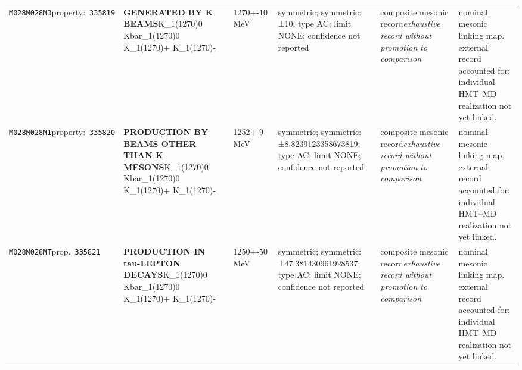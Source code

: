 \begin{landscape}
\begin{longtable}{L{1.85cm}L{4.45cm}L{2.35cm}L{4.05cm}L{3.35cm}L{7.15cm}}
\texttt{M028}\newline \texttt{M028M3}\newline property:\ \texttt{335819} & \textbf{GENERATED BY K BEAMS}\newline K\_\allowbreak{}1(1270)0 \textbar{}\allowbreak{} Kbar\_\allowbreak{}1(1270)0 \textbar{}\allowbreak{} K\_\allowbreak{}1(1270)+ \textbar{}\allowbreak{} K\_\allowbreak{}1(1270)- & 1270+-10\,MeV & symmetric; symmetric: ±10; type AC; limit NONE; confidence not reported & composite mesonic record\newline \emph{exhaustive record without promotion to comparison} & nominal mesonic linking map. external record accounted for; individual HMT--MD realization not yet linked. \\
\texttt{M028}\newline \texttt{M028M1}\newline property:\ \texttt{335820} & \textbf{PRODUCTION BY BEAMS OTHER THAN K MESONS}\newline K\_\allowbreak{}1(1270)0 \textbar{}\allowbreak{} Kbar\_\allowbreak{}1(1270)0 \textbar{}\allowbreak{} K\_\allowbreak{}1(1270)+ \textbar{}\allowbreak{} K\_\allowbreak{}1(1270)- & 1252+-9\,MeV & symmetric; symmetric: ±8.8239123358673819; type AC; limit NONE; confidence not reported & composite mesonic record\newline \emph{exhaustive record without promotion to comparison} & nominal mesonic linking map. external record accounted for; individual HMT--MD realization not yet linked. \\
\texttt{M028}\newline \texttt{M028MT}\newline prop.\ \texttt{335821} & \textbf{PRODUCTION IN tau-LEPTON DECAYS}\newline K\_\allowbreak{}1(1270)0 \textbar{}\allowbreak{} Kbar\_\allowbreak{}1(1270)0 \textbar{}\allowbreak{} K\_\allowbreak{}1(1270)+ \textbar{}\allowbreak{} K\_\allowbreak{}1(1270)- & 1250+-50\,MeV & symmetric; symmetric: ±47.381430961928537; type AC; limit NONE; confidence not reported & composite mesonic record\newline \emph{exhaustive record without promotion to comparison} & nominal mesonic linking map. external record accounted for; individual HMT--MD realization not yet linked. \\

\end{longtable}
\end{landscape}
